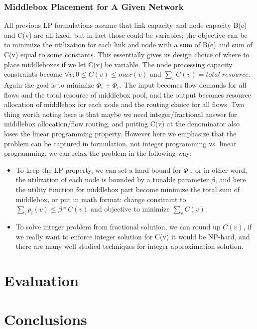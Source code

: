 \documentclass{sig-alternate}
\begin{document}
\subsubsection{Middlebox Placement for A Given Network} 
All previous LP formulations assume that link capacity and node capacity B(e) and C(v) are all fixed, but in fact those could be variables; the objective can be to minimize the utilization for each link and node with a sum of B(e) and sum of C(v) equal to some constants. This essentially gives us design choice of where to place middleboxes if we let C(v) be variable. The node processing capacity constraints become $\forall v; 0 \leq C(v) \leq max(v) $ and $\sum\limits_v C(v) = total\;resource$. Again the goal is to minimize $\Phi_e + \Phi_v$. The input becomes flow demands for all flows and the total resource of middlebox pool, and the output becomes resource allocation of middlebox for each node and the routing choice for all flows. Two thing worth noting here is that maybe we need integer/fractional answer for middlebox allocation/flow routing, and putting C(v) at the denominator also loses the linear programming property. However here we emphasize that the problem can be captured in formulation, not integer programming vs. linear programming, we can relax the problem in the following way:
\begin{itemize}
\item To keep the LP property, we can set a hard bound for $\Phi_v$, or in other word, the utilization of each node is bounded by a tunable parameter $\beta$, and here the utility function for middlebox part become minimize the total sum of middlebox, or put in math format: change constraint to $\sum\limits_i p_i(v) \leq \beta*C(v)$ and objective to minimize $\sum\limits_v C(v)$.

\item To solve integer problem from fractional solution, we can round up $C(v)$, if we really want to enforce integer solution for C(v) it would be NP-hard, and there are many well studied techniques for integer approximation solution.
\end{itemize}

\section{Evaluation}


\section{Conclusions}
\end{document}
